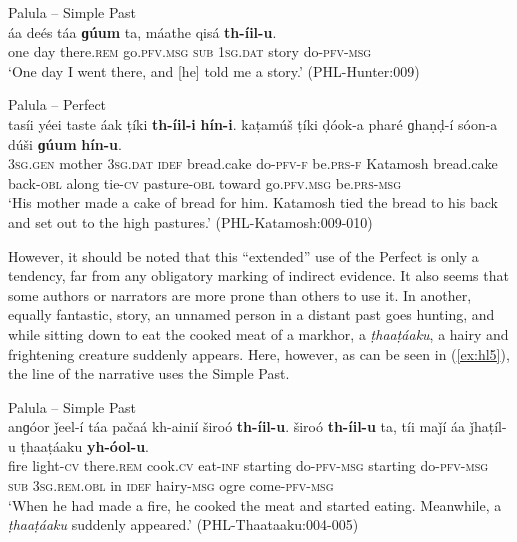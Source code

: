\documentclass[output=paper]{langsci/langscibook}
\begin{document}
\begin{exe}
	\ex Palula -- Simple Past \label{ex:hl3}\\
	\gll áa deés táa \textbf{ɡúum} ta, máathe qisá \textbf{th-íil-u}.\\
	one day there.\textsc{rem} go.\textsc{pfv}.\textsc{msg} \textsc{sub} 1\textsc{sg}.\textsc{dat} story do-\textsc{pfv}-\textsc{msg} \\
	\trans ‘One day I went there, and [he] told me a story.’ (PHL-Hunter:009)
\end{exe}

\begin{exe}
	\ex Palula -- Perfect \label{ex:hl4}\\
	\gll tasíi yéei taste áak ṭíki \textbf{th-íil-i} \textbf{hín-i}. kaṭamúš ṭíki ḍóok-a pharé ɡhaṇḍ-í sóon-a dúši \textbf{ɡúum} \textbf{hín-u}.\\
	3\textsc{sg}.\textsc{gen} mother 3\textsc{sg}.\textsc{dat} \textsc{idef} bread.cake do-\textsc{pfv}-\textsc{f} be.\textsc{prs}-\textsc{f} Katamosh bread.cake back-\textsc{obl} along tie-\textsc{cv} pasture-\textsc{obl} toward go.\textsc{pfv}.\textsc{msg} be.\textsc{prs}-\textsc{msg}\\
	\trans ‘His mother made a cake of bread for him. Katamosh tied the bread to his back and set out to the high pastures.’ (PHL-Katamosh:009-010)
\end{exe}

However, it should be noted that this “extended” use of the Perfect is only a tendency, far from any obligatory marking of indirect evidence. It also seems that some authors or narrators are more prone than others to use it. In another, equally fantastic, story, an unnamed person in a distant past goes hunting, and while sitting down to eat the cooked meat of a markhor, a \textit{ṭhaaṭáaku}, a hairy and frightening creature suddenly appears. Here, however, as can be seen in ‎(\ref{ex:hl5}), the line of the narrative uses the Simple Past.

\begin{exe}
	\ex Palula -- Simple Past \label{ex:hl5}\\
	\gll anɡóor ǰeel-í táa pačaá kh-ainií široó \textbf{th-íil-u}. široó \textbf{th-íil-u} ta, tíi maǰí áa ǰhaṭíl-u ṭhaaṭáaku \textbf{yh-óol-u}.\\
	fire light-\textsc{cv} there.\textsc{rem} cook.\textsc{cv} eat-\textsc{inf} starting do-\textsc{pfv}-\textsc{msg} starting do-\textsc{pfv}-\textsc{msg} \textsc{sub} 3\textsc{sg}.\textsc{rem}.\textsc{obl} in \textsc{idef} hairy-\textsc{msg} ogre come-\textsc{pfv}-\textsc{msg}\\
	\trans ‘When he had made a fire, he cooked the meat and started eating. Meanwhile, a \textit{ṭhaaṭáaku} suddenly appeared.’ (PHL-Thaataaku:004-005)
\end{exe}
\end{document}
